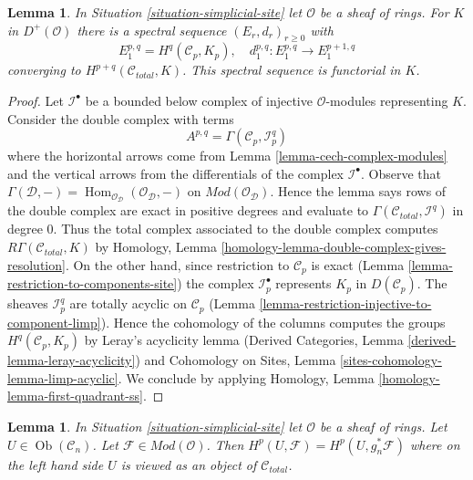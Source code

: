 \documentclass{stacks-project}
\theoremstyle{plain}
\newtheorem{lemma}[subsection]{Lemma}
\theoremstyle{definition}
\theoremstyle{remark}
\numberwithin{equation}{subsection}
\def\Hom{\mathop{\mathrm{Hom}}\nolimits}
\def\Ob{\mathop{\mathrm{Ob}}\nolimits}
\begin{document}
\begin{lemma}
\label{lemma-simplicial-module-cohomology-site}
In Situation \ref{situation-simplicial-site} let $\mathcal{O}$
be a sheaf of rings. For $K$ in $D^+(\mathcal{O})$
there is a spectral sequence $(E_r, d_r)_{r \geq 0}$ with
$$
E_1^{p, q} = H^q(\mathcal{C}_p, K_p),\quad
d_1^{p, q} : E_1^{p, q} \to E_1^{p + 1, q}
$$
converging to $H^{p + q}(\mathcal{C}_{total}, K)$.
This spectral sequence is functorial in $K$.
\end{lemma}

\begin{proof}
Let $\mathcal{I}^\bullet$ be a bounded below complex of injective
$\mathcal{O}$-modules representing $K$. Consider the double complex with terms
$$
A^{p, q} = \Gamma(\mathcal{C}_p, \mathcal{I}^q_p)
$$
where the horizontal arrows come from
Lemma \ref{lemma-cech-complex-modules}
and the vertical arrows from the differentials of the
complex $\mathcal{I}^\bullet$. Observe that
$\Gamma(\mathcal{D}, -) =
\Hom_{\mathcal{O}_\mathcal{D}}(\mathcal{O}_\mathcal{D}, -)$
on $\textit{Mod}(\mathcal{O}_\mathcal{D})$. Hence the lemma
says rows of the double complex are exact
in positive degrees and evaluate to
$\Gamma(\mathcal{C}_{total}, \mathcal{I}^q)$ in degree $0$.
Thus the total complex associated to the double complex
computes $R\Gamma(\mathcal{C}_{total}, K)$ by
Homology, Lemma \ref{homology-lemma-double-complex-gives-resolution}.
On the other hand, since restriction to $\mathcal{C}_p$ is exact
(Lemma \ref{lemma-restriction-to-components-site})
the complex $\mathcal{I}_p^\bullet$ represents $K_p$ in
$D(\mathcal{C}_p)$. The sheaves $\mathcal{I}_p^q$
are totally acyclic on $\mathcal{C}_p$
(Lemma \ref{lemma-restriction-injective-to-component-limp}).
Hence the cohomology of the columns computes the groups
$H^q(\mathcal{C}_p, K_p)$ by Leray's acyclicity lemma
(Derived Categories, Lemma \ref{derived-lemma-leray-acyclicity})
and
Cohomology on Sites, Lemma \ref{sites-cohomology-lemma-limp-acyclic}.
We conclude by applying
Homology, Lemma \ref{homology-lemma-first-quadrant-ss}.
\end{proof}

\begin{lemma}
\label{lemma-sanity-check-modules}
In Situation \ref{situation-simplicial-site} let $\mathcal{O}$
be a sheaf of rings. Let $U \in \Ob(\mathcal{C}_n)$. Let
$\mathcal{F} \in \textit{Mod}(\mathcal{O})$.
Then $H^p(U, \mathcal{F}) = H^p(U, g_n^*\mathcal{F})$
where on the left hand side $U$ is viewed as an object of
$\mathcal{C}_{total}$.
\end{lemma}
\end{document}
